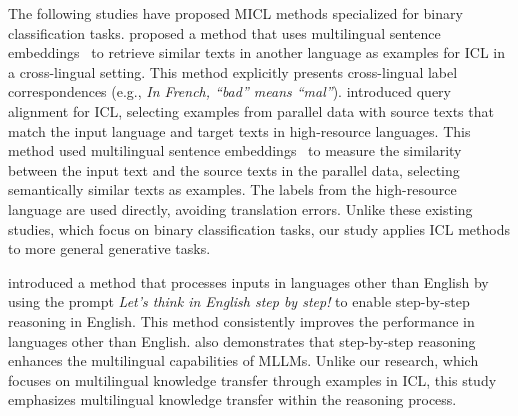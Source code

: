 The following studies have proposed MICL methods specialized for binary classification tasks.
\citet{tanwar-etal-2023-multilingual} proposed a method that uses multilingual sentence embeddings~\cite{reimers-gurevych-2020-making} to retrieve similar texts in another language as examples for ICL in a cross-lingual setting.
This method explicitly presents cross-lingual label correspondences (e.g., \textit{In French, ``bad'' means ``mal''}).
\citet{cahyawijaya-etal-2024-llms} introduced query alignment for ICL, selecting examples from parallel data with source texts that match the input language and target texts in high-resource languages.
This method used multilingual sentence embeddings~\cite{reimers-gurevych-2019-sentence,reimers-gurevych-2020-making} to measure the similarity between the input text and the source texts in the parallel data, selecting semantically similar texts as examples.
The labels from the high-resource language are used directly, avoiding translation errors.
Unlike these existing studies, which focus on binary classification tasks, our study applies ICL methods to more general generative tasks.

\citet{qin-etal-2023-cross} introduced a method that processes inputs in languages other than English by using the prompt \textit{Let’s think in English step by step!} to enable step-by-step reasoning in English.
This method consistently improves the performance in languages other than English.
\citet{shi2023language} also demonstrates that step-by-step reasoning enhances the multilingual capabilities of MLLMs.
Unlike our research, which focuses on multilingual knowledge transfer through examples in ICL, this study emphasizes multilingual knowledge transfer within the reasoning process.
